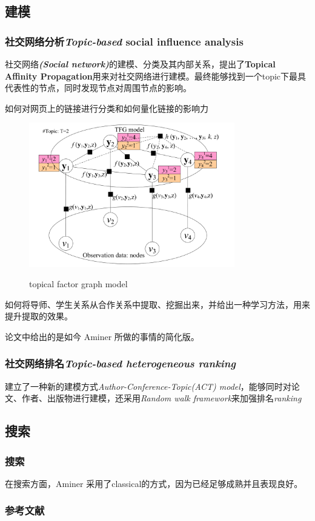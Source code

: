\documentclass[UTF8]{ctexbeamer}
\begin{document}
\subsection{建模}
\begin{frame}[allowframebreaks]
    \frametitle{社交网络分析\textit{Topic-based} social influence analysis}
    社交网络\textbf{\textit{(Social network)}}的建模、分类及其内部关系，提出了\textbf{Topical Affinity Propagation}用来对社交网络进行建模。最终能够找到一个topic下最具代表性的节点，同时发现节点对周围节点的影响。
    \cite{tang2009social}

    如何对网页上的链接进行分类和如何量化链接的影响力
    \cite{tang2009topic}
    \begin{figure}[h]
        \caption{topical factor graph model}
        \centering
        \includegraphics[width=0.8\textwidth]{assets/figures/model1.png}
        \label{fig:model1}
    \end{figure}


    如何将导师、学生关系从合作关系中提取、挖掘出来，并给出一种学习方法，用来提升提取的效果。

    论文\cite{tang2009topic,yang2010social,wang2010mining}中给出的是如今 Aminer 所做的事情的简化版。

\end{frame}

\begin{frame}[allowframebreaks]
    \frametitle{社交网络排名\textit{Topic-based heterogeneous ranking}}
    建立了一种新的建模方式\textit{Author-Conference-Topic(ACT) model}，能够同时对论文、作者、出版物进行建模，还采用\textit{Random walk framework}来加强排名\textit{ranking}\cite{tang2008topic} 
    

\end{frame}


\subsection{搜索}
\begin{frame}
    \frametitle{搜索}

    在搜索方面，Aminer 采用了classical的方式\cite{tang2008arnetminer}，因为已经足够成熟并且表现良好。

\end{frame}


\begin{frame}[allowframebreaks]
    \frametitle{参考文献}

    

\end{frame}
\end{document}
